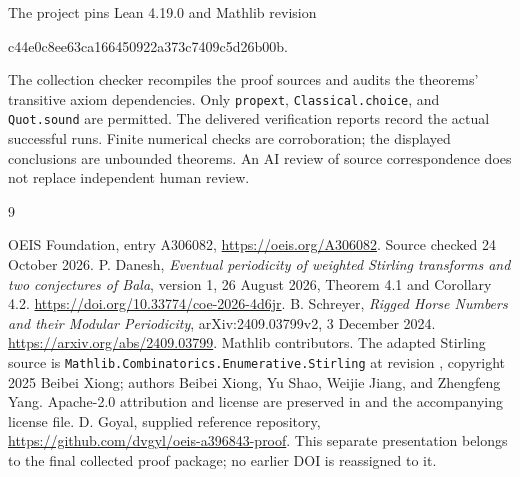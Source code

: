 \documentclass[11pt,a4paper]{article}
\theoremstyle{remark}
\begin{document}
The project pins Lean 4.19.0 and Mathlib revision
\begin{center}\small\ttfamily
c44e0c8ee63ca166450922a373c7409c5d26b00b.
\end{center}
The collection checker recompiles the proof sources and audits the
theorems' transitive axiom dependencies. Only \texttt{propext},
\texttt{Classical.choice}, and \texttt{Quot.sound} are permitted.
The delivered verification reports record the actual successful runs.
Finite numerical checks are corroboration; the displayed conclusions are
unbounded theorems. An AI review of source correspondence does not replace
independent human review.
\begin{thebibliography}{9}
\raggedright
{} OEIS Foundation, entry A306082,
\url{https://oeis.org/A306082}. Source checked 24 October 2026.
 P. Danesh, \emph{Eventual periodicity of weighted
Stirling transforms and two conjectures of Bala}, version 1,
26 August 2026, Theorem 4.1 and Corollary 4.2.
\url{https://doi.org/10.33774/coe-2026-4d6jr}.
 B. Schreyer, \emph{Rigged Horse Numbers and their
Modular Periodicity}, arXiv:2409.03799v2, 3 December 2024.
\url{https://arxiv.org/abs/2409.03799}.
 Mathlib contributors. The adapted Stirling source is
\texttt{Mathlib.Combinatorics.Enumerative.Stirling} at revision
, copyright 2025 Beibei Xiong;
authors Beibei Xiong, Yu Shao, Weijie Jiang, and Zhengfeng Yang.
Apache-2.0 attribution and license are preserved in
 and the accompanying license file.
 D. Goyal, supplied reference repository,
\url{https://github.com/dvgyl/oeis-a396843-proof}.
This separate presentation belongs to the final collected proof package;
no earlier DOI is reassigned to it.
\end{thebibliography}
\end{document}
